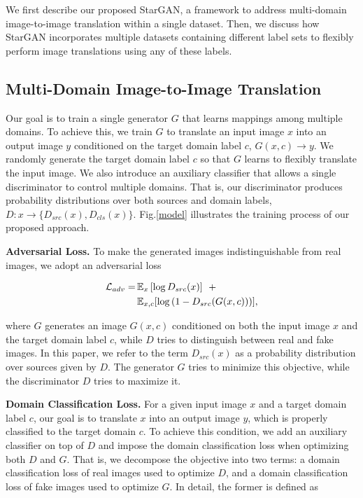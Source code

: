 We first describe our proposed StarGAN, a framework to address multi-domain image-to-image translation within a single dataset. Then, we discuss how StarGAN  incorporates multiple datasets containing different label sets to flexibly perform image translations using any of these labels. 
\subsection{Multi-Domain Image-to-Image Translation} Our goal is to train a single generator $G$ that learns mappings among multiple domains. To achieve this, we train $G$ to translate an input image $x$  into an output image $y$ conditioned on the target domain label $c$, $G(x, c) \rightarrow y$. We randomly generate the target domain label $c$ so that $G$ learns to flexibly translate the input image. We also introduce an auxiliary classifier \cite{odena2016conditional} that allows a single discriminator to control multiple domains. That is,  our discriminator produces probability distributions over both sources and domain labels, $D: x \rightarrow \{{D}_{src}(x), {D}_{cls}(x)\}$. Fig.\thinspace\ref{model} illustrates the training process of our proposed approach.

\medskip

 \textbf{Adversarial Loss.} To make the generated images indistinguishable from real images, we adopt an adversarial loss

\begin{equation}
\begin{split}
 \mathcal{L}_{adv} = & \thinspace {\mathbb{E}}_{x} \left[ \log{{D}_{src}(x)} \right]  \> \>  +   \\
 & \thinspace {\mathbb{E}}_{x, c}[\log{(1 - {D}_{src}(G(x, c)))}],
\end{split}
\label{eq1}
\end{equation}

 where $G$ generates an image $G(x, c)$ conditioned on both the input image $x$ and the target domain label $c$, while $D$ tries to distinguish between real and fake images. In this paper, we refer to the term ${D}_{src}(x)$ as a probability distribution over sources given by $D$. The generator $G$ tries to minimize this objective, while the discriminator $D$ tries to maximize it.

\medskip

 \textbf{Domain Classification Loss.} For a given input image $x$ and a target domain label $c$, our goal is to translate $x$ into an output image $y$, which is properly classified to the target domain $c$. To achieve this condition, we add an auxiliary classifier on top of $D$ and impose the domain classification loss when optimizing both $D$ and $G$. That is, we decompose the objective into two terms: a domain classification loss of real images used to optimize $D$, and a domain classification loss of fake images used to optimize $G$. In detail, the former is defined as

